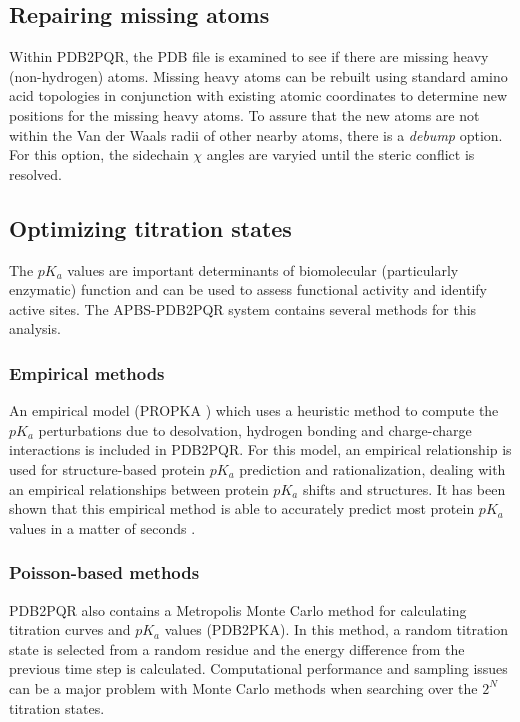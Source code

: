 \documentclass[journal=jpcbfk, manuscript=article]{achemso}
\begin{document}
\subsection{Repairing missing atoms}
Within PDB2PQR, the PDB file is examined to see if there are missing heavy (non-hydrogen) atoms. Missing heavy atoms can be rebuilt using standard amino acid topologies in conjunction with existing atomic coordinates to determine new positions for the missing heavy atoms. To assure that the new atoms are not within the Van der Waals radii of other nearby atoms, there is a \textit{debump} option. For this option, the sidechain $\chi$ angles are varyied until the steric conflict is resolved.

\subsection{Optimizing titration states}
The $pK_a$ values are important determinants of biomolecular (particularly enzymatic) function and can be used to assess functional activity and identify active sites. The APBS-PDB2PQR system contains several methods for this analysis.

\subsubsection{Empirical methods}
An empirical model (PROPKA \cite{sondergaard2011}) which uses a heuristic method to compute the $pK_a$ perturbations due to desolvation, hydrogen bonding and charge-charge interactions is included in PDB2PQR. For this model, an empirical relationship is used for structure-based protein $pK_a$ prediction and rationalization, dealing with an empirical relationships between protein $pK_a$ shifts and structures. It has been shown that this empirical method is able to accurately predict most protein $pK_a$ values in a matter of seconds \cite{liPROPKA2005}.

\subsubsection{Poisson-based methods}
PDB2PQR also contains a Metropolis Monte Carlo method for calculating titration curves and $pK_a$ values (PDB2PKA). In this method, a random titration state is selected from a random residue and the energy difference from the previous time step is calculated. Computational performance and sampling issues can be a major problem with Monte Carlo methods when searching over the $2^N$ titration states.
\end{document}
